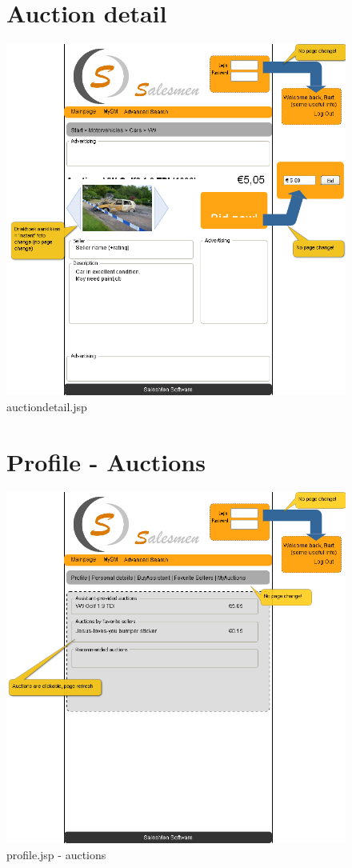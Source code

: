 \documentclass[a4paper, 12pt]{report}
\begin{document}
\begin{figure}
\section{Auction detail}
\label{fig_prototype_auctiondetail}
\includegraphics[width=15cm]{../../img/SM_auction_detail.png}
\caption{auctiondetail.jsp}
\end{figure}
\begin{figure}
\section{Profile - Auctions}
\label{fig_prototype_profile_auctions}
\includegraphics[width=15cm]{../../img/SM_mySM_auctions.png}
\caption{profile.jsp - auctions}
\end{figure}
\end{document}
